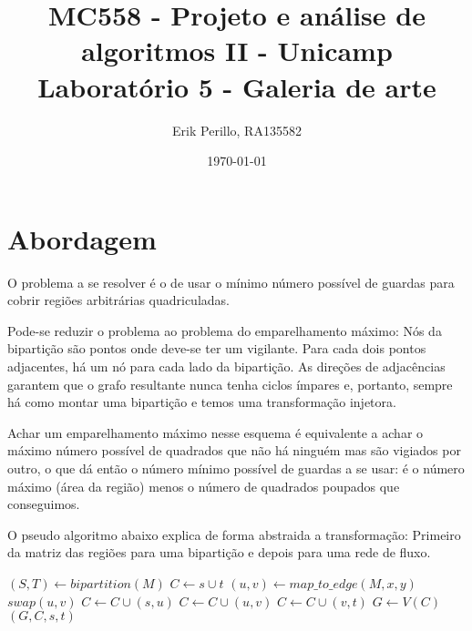 \documentclass[7pt]{article}
\begin{document}

\author{Erik Perillo, RA135582}
\date{\today}
\title{%
	{\small MC558 - Projeto e análise de algoritmos II - Unicamp}\\
	{\Large Laboratório 5 - Galeria de arte}}
\maketitle\vspace{-0.5cm}
\posttitle{\par\end{center}}

\makeatletter
\def\BState{\State\hskip-\ALG@thistlm}
\makeatother

\section{Abordagem}
O problema a se resolver é o de usar o mínimo número possível de guardas
para cobrir regiões arbitrárias quadriculadas.

Pode-se reduzir o problema ao problema do emparelhamento máximo:
Nós da bipartição são pontos onde deve-se ter um vigilante.
Para cada dois pontos adjacentes, há um nó para cada lado da bipartição.
As direções de adjacências garantem que o grafo resultante nunca tenha
ciclos ímpares e, portanto, sempre há como montar uma bipartição e
temos uma transformação injetora.

Achar um emparelhamento máximo nesse esquema é equivalente a achar o máximo
número possível de quadrados que não há ninguém mas são vigiados por outro,
o que dá então o número mínimo possível de guardas a se usar: é o número
máximo (área da região) menos o número de quadrados poupados que conseguimos.

O pseudo algoritmo abaixo explica de forma abstraida a transformação: Primeiro
da matriz das regiões para uma bipartição e depois para uma rede de fluxo.
\begin{algorithm}
\caption{}\label{Galeria}
\begin{algorithmic}[1]
    \State $(S, T) \gets bipartition(M)$
    \State $C \gets s \cup t$
        \State $(u, v) \gets map\_to\_edge(M, x, y)$
            \State $swap(u, v)$
        \EndIf
        \State $C \gets C \cup (s, u)$
        \State $C \gets C \cup (u, v)$
        \State $C \gets C \cup (v, t)$
	\EndFor
    \State $G \gets V(C)$\\
    \Return $(G, C, s, t)$
    \EndProcedure
\end{algorithmic}
\end{algorithm}
\end{document}
